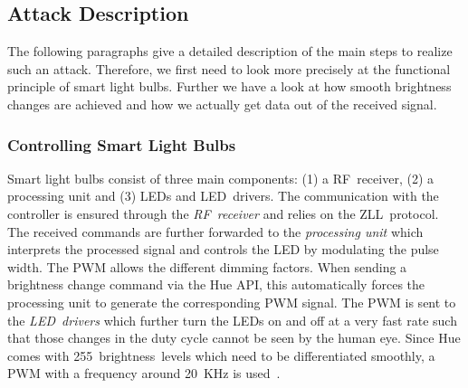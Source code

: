 
\subsection{Attack Description} %
\label{sec:exp:description}


The following paragraphs give a detailed description of the main steps to realize such an attack. Therefore, we first need to look more precisely at the functional principle of smart light bulbs. Further we have a look at how smooth brightness changes are achieved and how we actually get data out of the received signal.\newline



\subsubsection{Controlling Smart Light Bulbs} 
Smart light bulbs consist of three main components: (1) a RF~receiver, (2) a processing unit and (3) LEDs and LED~drivers.
The communication with the controller is ensured through the \textit{RF~receiver} and relies on the ZLL~protocol. The received commands are further forwarded to the \textit{processing unit} which interprets the processed signal and controls the LED by modulating the pulse width. The PWM allows the different dimming factors. When sending a brightness change command via the Hue API, this automatically forces the processing unit to generate the corresponding PWM signal. The PWM is sent to the \textit{LED~drivers} which further turn the LEDs on and off at a very fast rate such that those changes in the duty cycle cannot be seen by the human eye. Since Hue comes with 255~brightness~levels which need to be differentiated smoothly, a PWM with a frequency around 20~KHz is used~\cite{Ronen:2016:EFAIDCSL}. 

